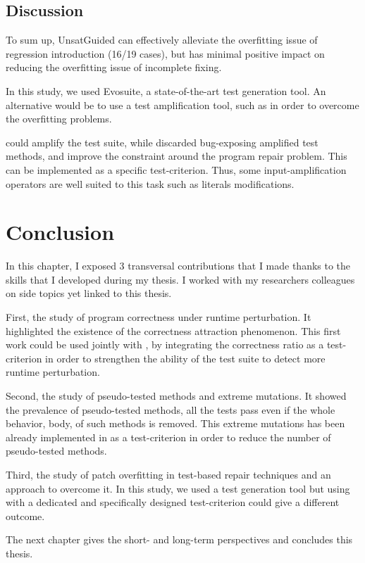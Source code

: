 \subsection{Discussion}
\label{subsec:transversal-contributions:test-for-repair:conclusion}

To sum up, UnsatGuided can effectively alleviate the overfitting issue of regression introduction (16/19 cases), but has minimal positive impact on reducing the overfitting issue of incomplete fixing.

In this study, we used Evosuite, a state-of-the-art test generation tool.
An alternative would be to use a test amplification tool, such as \dspot in order to overcome the overfitting problems.

\dspot could amplify the test suite, while discarded bug-exposing amplified test methods, and improve the constraint around the program repair problem.
This can be implemented as a specific test-criterion.
Thus, some input-amplification operators are well suited to this task such as literals modifications.

\section{Conclusion}
\label{sec:transversal-contributions:conclusion}

In this chapter, I exposed 3 transversal contributions that I made thanks to the skills that I developed during my thesis.
I worked with my researchers colleagues on side topics yet linked to this thesis.

First, the study of program correctness under runtime perturbation.
It highlighted the existence of the correctness attraction phenomenon.
This first work could be used jointly with \dspot, by integrating the correctness ratio as a test-criterion in order to strengthen the ability of the test suite to detect more runtime perturbation.

Second, the study of pseudo-tested methods and extreme mutations.
It showed the prevalence of pseudo-tested methods, all the tests pass even if the whole behavior, \ie body, of such methods is removed.
This extreme mutations has been already implemented in \dspot as a test-criterion in order to reduce the number of pseudo-tested methods.

Third, the study of patch overfitting in test-based repair techniques and an approach to overcome it.
In this study, we used a test generation tool but using \dspot with a dedicated and specifically designed test-criterion could give a different outcome.

The next chapter gives the short- and long-term perspectives and concludes this thesis.